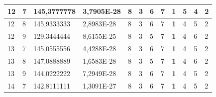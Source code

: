 \documentclass[conference]{IEEEtran}
\begin{document}
\begin{table}[]
\begin{tabular}{|llll|llllllll|}
		\multicolumn{1}{|l|}{12}  & \multicolumn{1}{l|}{7}         & \multicolumn{1}{l|}{145,3777778}   & 3,7905E-28 & \multicolumn{1}{l|}{8}   & \multicolumn{1}{l|}{3}   & \multicolumn{1}{l|}{6}   & \multicolumn{1}{l|}{7}   & \multicolumn{1}{l|}{\textbf{1}} & \multicolumn{1}{l|}{5}   & \multicolumn{1}{l|}{4}   & 2                      \\ \hline
		\multicolumn{1}{|l|}{12}  & \multicolumn{1}{l|}{8}         & \multicolumn{1}{l|}{145,9333333}   & 2,8983E-28 & \multicolumn{1}{l|}{8}   & \multicolumn{1}{l|}{3}   & \multicolumn{1}{l|}{6}   & \multicolumn{1}{l|}{7}   & \multicolumn{1}{l|}{\textbf{1}} & \multicolumn{1}{l|}{4}   & \multicolumn{1}{l|}{5}   & 2                      \\ \hline
		\multicolumn{1}{|l|}{12}  & \multicolumn{1}{l|}{9}         & \multicolumn{1}{l|}{129,3444444}   & 8,6155E-25 & \multicolumn{1}{l|}{8}   & \multicolumn{1}{l|}{3}   & \multicolumn{1}{l|}{5}   & \multicolumn{1}{l|}{7}   & \multicolumn{1}{l|}{\textbf{1}} & \multicolumn{1}{l|}{4}   & \multicolumn{1}{l|}{6}   & 2                      \\ \hline
		\multicolumn{1}{|l|}{13}  & \multicolumn{1}{l|}{7}         & \multicolumn{1}{l|}{145,0555556}   & 4,4288E-28 & \multicolumn{1}{l|}{8}   & \multicolumn{1}{l|}{3}   & \multicolumn{1}{l|}{6}   & \multicolumn{1}{l|}{7}   & \multicolumn{1}{l|}{\textbf{1}} & \multicolumn{1}{l|}{4}   & \multicolumn{1}{l|}{5}   & 2                      \\ \hline
		\multicolumn{1}{|l|}{13}  & \multicolumn{1}{l|}{8}         & \multicolumn{1}{l|}{147,0888889}   & 1,6583E-28 & \multicolumn{1}{l|}{8}   & \multicolumn{1}{l|}{3}   & \multicolumn{1}{l|}{5}   & \multicolumn{1}{l|}{7}   & \multicolumn{1}{l|}{\textbf{1}} & \multicolumn{1}{l|}{4}   & \multicolumn{1}{l|}{6}   & 2                      \\ \hline
		\multicolumn{1}{|l|}{13}  & \multicolumn{1}{l|}{9}         & \multicolumn{1}{l|}{144,0222222}   & 7,2949E-28 & \multicolumn{1}{l|}{8}   & \multicolumn{1}{l|}{3}   & \multicolumn{1}{l|}{6}   & \multicolumn{1}{l|}{7}   & \multicolumn{1}{l|}{\textbf{1}} & \multicolumn{1}{l|}{4}   & \multicolumn{1}{l|}{5}   & 2                      \\ \hline
		\multicolumn{1}{|l|}{14}  & \multicolumn{1}{l|}{7}         & \multicolumn{1}{l|}{142,8111111}   & 1,3091E-27 & \multicolumn{1}{l|}{8}   & \multicolumn{1}{l|}{3}   & \multicolumn{1}{l|}{6}   & \multicolumn{1}{l|}{7}   & \multicolumn{1}{l|}{\textbf{1}} & \multicolumn{1}{l|}{4}   & \multicolumn{1}{l|}{5}   & 2                      \\ \hline

\end{tabular}
\end{table}
\end{document}
